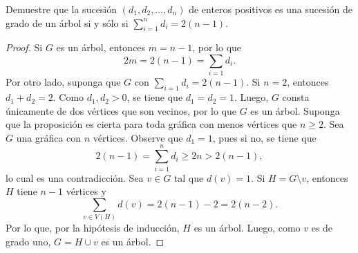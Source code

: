 \documentclass[12pt]{article}
\newenvironment{problem}[2][Problema]{\begin{trivlist}
\item[\hskip \labelsep {\bfseries #1}\hskip \labelsep {\bfseries #2.}]}{\end{trivlist}}
\begin{document}
\begin{problem}{4.1.7}
Demuestre que la sucesión $(d_1, d_2, \ldots, d_n)$ de enteros positivos es una sucesión de grado de un árbol si y sólo si $\sum_{i=1}^n d_i = 2(n-1).$
\end{problem}
\begin{proof}
Si $G$ es un árbol, entonces $m = n-1$, por lo que 
$$2m = 2(n-1) = \sum_{i=1} d_i.$$
Por otro lado, suponga que $G$ con $\sum_{i=1} d_i = 2(n-1).$ Si $n=2$, entonces $d_1 + d_2 = 2$. Como $d_1, d_2 > 0$, se tiene que $d_1 = d_2 = 1.$ Luego, $G$ consta únicamente de dos vértices que son vecinos, por lo que $G$ es un árbol.
Suponga que la proposición es cierta para toda gráfica con menos vértices que $n\geq 2.$ Sea $G$ una gráfica con $n$ vértices. Observe que $d_1 = 1$, pues si no, se tiene que 
$$2(n-1) = \sum_{i=1}^n d_i \geq 2n > 2(n-1),$$
lo cual es una contradicción. Sea $v \in G$ tal que $d(v) = 1.$ Si $H = G \setminus v$,  entonces $H$ tiene $n-1$ vértices y 
$$\sum_{v \in V(H)} d(v) = 2(n-1) - 2 = 2(n-2).$$
Por lo que, por la hipótesis de inducción, $H$ es un árbol. Luego, como $v$ es de grado uno, $G = H \cup v$ es un árbol.
\end{proof}
\end{document}
